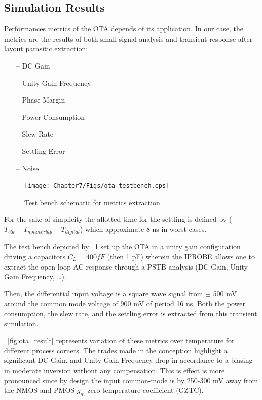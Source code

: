 \subsection{Simulation Results}              %
\label{sec:ota-sim-result}
Performances metrics of the OTA depends of its application. In our case, the metrics are the results of both small signal analysis and transient response after layout parasitic extraction:
\begin{multicols}{2}
    \begin{itemize}
        \itemsep-0.5em
        \item[--] DC Gain
        \item[--] Unity-Gain Frequency
        \item[--] Phase Margin
        \item[--] Power Consumption
        \item[--] Slew Rate
        \item[--] Settling Error
        \item[--] Noise
    \end{itemize}
\end{multicols}

\begin{figure}[htp]
    \centering
    \texttt{[image: Chapter7/Figs/ota\_testbench.eps]}
    \caption{Test bench schematic for metrics extraction}
    \label{fig:ota_testbench}
\end{figure}

For the sake of simplicity the allotted time for the settling is defined by (\(T_{clk} - T_{nonoverlap} - T_{digital}\)) which approximate 8 ns in worst cases.

The test bench depicted by \figurename~\ref{fig:ota_testbench} set up the OTA in a unity gain configuration driving a capacitors \(C_L = 400 fF\) (then 1 pF) wherein the IPROBE allows one to extract the open loop AC response through a PSTB analysis (DC Gain, Unity Gain Frequency, \ldots).

Then, the differential input voltage is a square wave signal from \(\pm\) 500 mV around the common mode voltage of 900 mV of period 16 ns. Both the power consumption, the slew rate, and the settling error is extracted from this transient simulation.


\figurename~\ref{fig:ota_result} represents variation of these metrics over temperature for different process corners. The trades made in the conception highlight a significant DC Gain, and Unity Gain Frequency drop in accordance to a biasing in moderate inversion without any compensation. This is effect is more pronounced since by design the input common-mode is by 250-300 mV away from the NMOS and PMOS \(g_m \)-zero temperature coefficient (GZTC).

